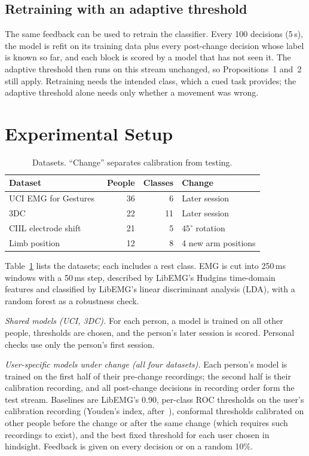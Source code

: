 \documentclass[conference]{IEEEtran}
\begin{document}
\subsection{Retraining with an adaptive threshold}
The same feedback can be used to retrain the classifier. Every 100 decisions (5\,s), the model is refit on its training data plus every post-change decision whose label is known so far, and each block is scored by a model that has not seen it. The adaptive threshold then runs on this stream unchanged, so Propositions~1 and~2 still apply. Retraining needs the intended class, which a cued task provides; the adaptive threshold alone needs only whether a movement was wrong.

\section{Experimental Setup}

\begin{table}[t]
\caption{Datasets. ``Change'' separates calibration from testing.}
\label{tab:data}
\centering
\footnotesize
\begin{tabular}{@{}lrrl@{}}
\toprule
Dataset & People & Classes & Change \\
\midrule
UCI EMG for Gestures~\cite{krilova2018} & 36 & 6 & Later session \\
3DC~\cite{coteallard2019} & 22 & 11 & Later session \\
CIIL electrode shift~\cite{campbell2024} & 21 & 5 & $45^\circ$ rotation \\
Limb position~\cite{fougner2011} & 12 & 8 & 4 new arm positions \\
\bottomrule
\end{tabular}
\end{table}

Table~\ref{tab:data} lists the datasets; each includes a rest class. EMG is cut into 250\,ms windows with a 50\,ms step, described by LibEMG's Hudgins time-domain features and classified by LibEMG's linear discriminant analysis (LDA), with a random forest as a robustness check.

\emph{Shared models (UCI, 3DC).} For each person, a model is trained on all other people, thresholds are chosen, and the person's later session is scored. Personal checks use only the person's first session.

\emph{User-specific models under change (all four datasets).} Each person's model is trained on the first half of their pre-change recordings; the second half is their calibration recording, and all post-change decisions in recording order form the test stream. Baselines are LibEMG's 0.90, per-class ROC thresholds on the user's calibration recording (Youden's index, after~\cite{menon2015}), conformal thresholds calibrated on other people before the change or after the same change (which requires such recordings to exist), and the best fixed threshold for each user chosen in hindsight. Feedback is given on every decision or on a random 10\%.
\end{document}
